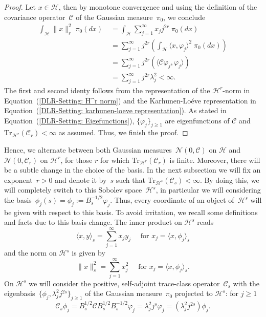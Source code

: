 \begin{proof}
 Let $x \in \mathcal{H}$, then by monotone convergence and using the definition of the covariance operator~$\mathcal{C}$ of the Gaussian measure~$\pi_0$, we conclude
 \begin{align*}
  \int_{\mathcal{H}} \| x \|_r^2 \; \pi_0 (dx) & \; = \int_{\mathcal{H}} \sum_{j=1}^{\infty} x_j j^{2r} \; \pi_0 (dx)  \\
  & \; = \sum_{j=1}^{\infty} j^{2r} ( \int_{\mathcal{H}}  \langle x, \varphi_j \rangle^2  \; \pi_0 (dx) )  \\
  & \; = \sum_{j=1}^{\infty} j^{2r} (   \langle \mathcal{C} \varphi_j, \varphi_j \rangle   )    \\
  & \; = \sum_{j=1}^{\infty} j^{2r} \lambda_j^2 < \infty.
 \end{align*}
 The first and second identy follows from the representation of the $\mathcal{H}^r$-norm in Equation~(\ref{DLR-Setting: H^r norm}) and the Karhunen-Lo\'{e}ve representation in Equation~(\ref{DLR-Setting: karhunen-loeve representation}). As stated in Equation~(\ref{DLR-Setting: Eigefunctions}), $\{  \varphi_j \}_{j \geq 1}$ are eigenfunctions of $\mathcal{C}$ and $\text{Tr}_{\mathcal{H}^r}(\mathcal{C}_r) < \infty$ as assumed. Thus, we finish the proof.

\end{proof}

Hence, we alternate between both Gaussian measures~$\mathcal{N}(0, \mathcal{C})$ on $\mathcal{H}$ and $\mathcal{N}(0, \mathcal{C}_r)$ on $\mathcal{H}^r$, for those $r$ for which $\text{Tr}_{\mathcal{H}^r}(\mathcal{C}_r)$ is finite. Moreover, there will be a subtle change in the choice of the basis. In the next subsection we will fix an exponent~$r>0$ and denote it by~$s$ such that $\text{Tr}_{\mathcal{H}^s}(\mathcal{C}_s) < \infty$. By doing this, we will completely switch to this Sobolev space~$\mathcal{H}^s$, in particular we will considering the basis~$\phi_j(s) = \phi_j := B^{-1/2}_s \varphi_j$. Thus, every coordinate of an object of~$\mathcal{H}^s$ will be given with respect to this basis. To avoid irritation, we recall some definitions and facts due to this basis change. The inner product on $\mathcal{H}^s$ reads
\begin{equation}
  \langle x, y \rangle_s = \sum_{j=1}^{\infty} x_j y_j \quad \text{ for } x_j = \langle x, \phi_j\rangle_s
\end{equation}
and the norm on $\mathcal{H}^s$ is given by
\begin{equation}
  \| x \|_s^2 = \sum_{j=1}^{\infty} x_j^2 \quad \text{ for } x_j = \langle x, \phi_j\rangle_s.
\end{equation}
On $\mathcal{H}^s$ we will consider the positive, self-adjoint trace-class operator~$\mathcal{C}_s$ with the eigenbasis~$\{ \phi_j,  \lambda_j^2 j^{2s} \}_{j \geq 1}$ of the Gaussian measure~$\pi_0$ projected to $\mathcal{H}^s$: for $j \geq 1$
\begin{equation}
\label{DLR-Setting: Definition Eigefunctions of C_s}
   \mathcal{C}_s \phi_j = B_s^{1/2} \mathcal{C}B^{1/2}_sB^{-1/2}_s \varphi_j  =  \lambda_j^2 j^s \varphi_j = ( \lambda_j^2 j^{2s}) \phi_j.
\end{equation}

